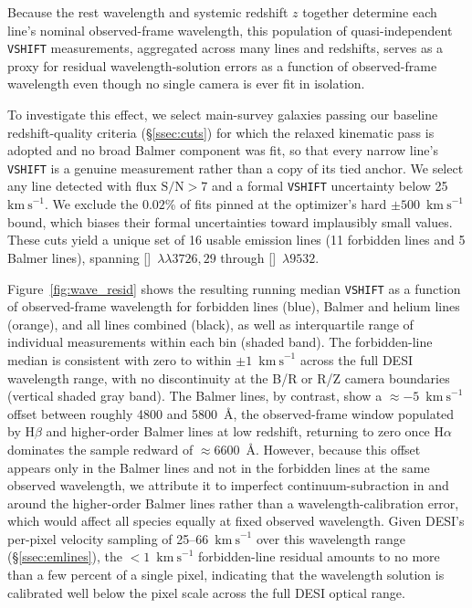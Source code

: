 \documentclass[modern,linenumbers]{aastex701}
\newcommand{\kms}{\ensuremath{\mathrm{km~s}^{-1}}}
\newcommand{\siii}{[\ion{S}{3}]}
\newcommand{\ha}{H\ensuremath{\alpha}}
\newcommand{\hb}{H\ensuremath{\beta}}
\newcommand{\oiidoublet}{[\ion{O}{2}]~$\lambda\lambda3726,29$}
\begin{document}
Because the rest wavelength and systemic redshift $z$ together
determine each line's nominal observed-frame wavelength, this
population of quasi-independent \texttt{VSHIFT} measurements,
aggregated across many lines and redshifts, serves as a proxy for
residual wavelength-solution errors as a function of observed-frame
wavelength even though no single camera is ever fit in isolation.

To investigate this effect, we select main-survey galaxies passing our
baseline redshift-quality criteria (\S\ref{ssec:cuts}) for which the
relaxed kinematic pass is adopted and no broad Balmer component was
fit, so that every narrow line's \texttt{VSHIFT} is a genuine
measurement rather than a copy of its tied anchor. We select any line
detected with flux $\mathrm{S/N}>7$ and a formal \texttt{VSHIFT}
uncertainty below 25~\kms. We exclude the $0.02$\% of fits pinned at
the optimizer's hard $\pm500$~\kms{} bound, which biases their formal
uncertainties toward implausibly small values. These cuts yield a
unique set of 16 usable emission lines (11 forbidden lines and 5
Balmer lines), spanning \oiidoublet{} through \siii~$\lambda9532$.

Figure~\ref{fig:wave_resid} shows the resulting running median
\texttt{VSHIFT} as a function of observed-frame wavelength for
forbidden lines (blue), Balmer and helium lines (orange), and all
lines combined (black), as well as interquartile range of individual
measurements within each bin (shaded band). The forbidden-line median
is consistent with zero to within $\pm1$~\kms{} across the full DESI
wavelength range, with no discontinuity at the B/R or R/Z camera
boundaries (vertical shaded gray band). The Balmer lines, by contrast,
show a $\approx-5$~\kms{} offset between roughly 4800 and 5800~\AA,
the observed-frame window populated by \hb{} and higher-order Balmer
lines at low redshift, returning to zero once \ha{} dominates the
sample redward of $\approx6600$~\AA. However, because this offset
appears only in the Balmer lines and not in the forbidden lines at the
same observed wavelength, we attribute it to imperfect
continuum-subraction in and around the higher-order Balmer lines
rather than a wavelength-calibration error, which would affect all
species equally at fixed observed wavelength. Given DESI's per-pixel
velocity sampling of 25--66~\kms{} over this wavelength range
(\S\ref{ssec:emlines}), the $<1$~\kms{} forbidden-line residual
amounts to no more than a few percent of a single pixel, indicating
that the wavelength solution is calibrated well below the pixel scale
across the full DESI optical range.
\end{document}
